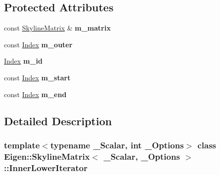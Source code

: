 \subsection*{Protected Attributes}
\begin{DoxyCompactItemize}
\item 
\mbox{\label{class_eigen_1_1_skyline_matrix_1_1_inner_lower_iterator_a3c51d6cac85e9b459b9e2600c9e2a277}} 
const \hyperlink{class_eigen_1_1_skyline_matrix}{Skyline\+Matrix} \& {\bfseries m\+\_\+matrix}
\item 
\mbox{\label{class_eigen_1_1_skyline_matrix_1_1_inner_lower_iterator_ab5f80f4f32176cd4bd3d9e78d46f3fee}} 
const \hyperlink{group___core___module_a554f30542cc2316add4b1ea0a492ff02}{Index} {\bfseries m\+\_\+outer}
\item 
\mbox{\label{class_eigen_1_1_skyline_matrix_1_1_inner_lower_iterator_ad5a247e27b9a36c10ca089b6826c2931}} 
\hyperlink{group___core___module_a554f30542cc2316add4b1ea0a492ff02}{Index} {\bfseries m\+\_\+id}
\item 
\mbox{\label{class_eigen_1_1_skyline_matrix_1_1_inner_lower_iterator_acbde5a6a99a5e0160a3c555d55851262}} 
const \hyperlink{group___core___module_a554f30542cc2316add4b1ea0a492ff02}{Index} {\bfseries m\+\_\+start}
\item 
\mbox{\label{class_eigen_1_1_skyline_matrix_1_1_inner_lower_iterator_a23e01f9c9d72af33b0a64622ffddba94}} 
const \hyperlink{group___core___module_a554f30542cc2316add4b1ea0a492ff02}{Index} {\bfseries m\+\_\+end}
\end{DoxyCompactItemize}


\subsection{Detailed Description}
\subsubsection*{template$<$typename \+\_\+\+Scalar, int \+\_\+\+Options$>$\newline
class Eigen\+::\+Skyline\+Matrix$<$ \+\_\+\+Scalar, \+\_\+\+Options $>$\+::\+Inner\+Lower\+Iterator}




